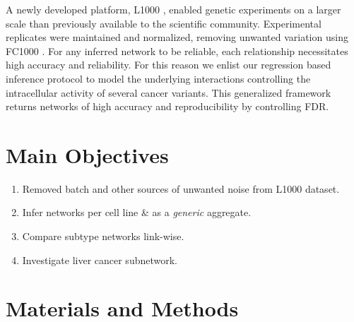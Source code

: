 \documentclass[a0,portrait]{a0poster}
\begin{document}
\begin{multicols}{2}
A newly developed platform, L1000 \cite{subramanian2017next}, enabled genetic experiments on a larger scale than previously available to the scientific community. Experimental replicates were maintained and normalized, removing unwanted variation using FC1000 \cite{lonnstedt2017fc1000}. For any inferred network to be reliable, each relationship necessitates high accuracy and reliability. For this reason we enlist our regression based inference protocol to model the underlying interactions controlling the intracellular activity of several cancer variants. This generalized framework returns networks of high accuracy and reproducibility by controlling FDR. %


\color{DarkSlateGray} %

\section*{Main Objectives}

\begin{enumerate}
\item Removed batch and other sources of unwanted noise from L1000 dataset.
\item Infer networks per cell line \& as a {\it generic} aggregate.
\item Compare subtype networks link-wise.
\item Investigate liver cancer subnetwork.
\end{enumerate}


\section*{Materials and Methods}


\end{multicols}
\end{document}
